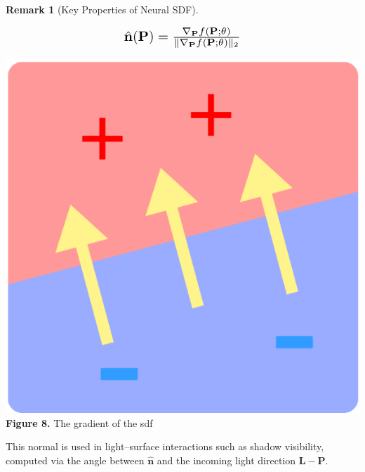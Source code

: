 \documentclass[12pt,a4paper]{article}
\theoremstyle{definition}
\newtheorem{remark}{Remark}[subsection]
\begin{document}
\begin{remark}[Key Properties of Neural SDF]
\begin{itemize}
    \begin{minipage}{0.5\textwidth}
    \begin{equation*}
    \scalebox{1.4}{$
    \hat{\mathbf{n}}(\mathbf{P}) 
    = \frac{\nabla_{\mathbf{P}} f(\mathbf{P}; \theta)}
        {\|\nabla_{\mathbf{P}} f(\mathbf{P}; \theta)\|_2}
    $}
    \end{equation*}
    \end{minipage}
    \hspace{-3em}
    \begin{minipage}{0.5\textwidth}
        \begin{center}
        \vspace{1em}
        \includegraphics[height=0.17\textheight]{sdf_vec.png} \\
        \textbf{Figure 8.} The gradient of the sdf \\
        \end{center}
    \end{minipage}

    This normal is used in light–surface interactions such as shadow visibility, computed via the angle between \(\hat{\mathbf{n}}\) and the incoming light direction \(\mathbf{L} - \mathbf{P}\).

    \newpage


\end{itemize}
\end{remark}
\end{document}
